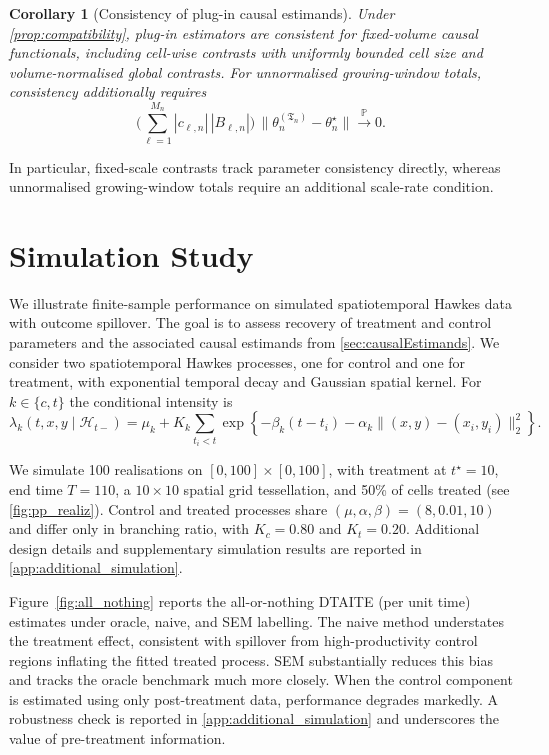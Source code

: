 \documentclass{statsoc}
\newtheorem{corollary}[corollary]{Corollary}
\newcommand{\1}{\mathbbm{1}}
\newcommand{\Tmax}{\mathfrak{T}}
\begin{document}
\begin{corollary}[Consistency of plug-in causal estimands]\label{cor:estimands-compat}
Under \cref{prop:compatibility}, plug-in estimators are consistent for fixed-volume causal functionals, including cell-wise contrasts with uniformly bounded cell size and volume-normalised global contrasts. For unnormalised growing-window totals, consistency additionally requires
\[
\Big(\sum_{\ell=1}^{M_n}|c_{\ell,n}|\,|B_{\ell,n}|\Big)\,
\|\theta_n^{(\Tmax_n)}-\theta_n^\star\|
\xrightarrow{\mathbb P}0.
\]
\end{corollary}

In particular, fixed-scale contrasts track parameter consistency directly, whereas unnormalised growing-window totals require an additional scale-rate condition.

\section{Simulation Study}\label{sec:simulation_study}

We illustrate finite-sample performance on simulated spatiotemporal Hawkes data with outcome spillover. The goal is to assess recovery of treatment and control parameters and the associated causal estimands from \cref{sec:causalEstimands}. We consider two spatiotemporal Hawkes processes, one for control and one for treatment, with exponential temporal decay and Gaussian spatial kernel. For $k\in\{c,t\}$ the conditional intensity is
\begin{equation*}
\lambda_k(t,x,y \mid \mathcal{H}_{t-}) = \mu_k + K_k \sum_{t_i < t} \exp\!\left\{-\beta_k (t-t_i)
- \alpha_k  \big\|(x,y) - (x_i,y_i)\big\|_{2}^{2} \right\}. 
\end{equation*}

We simulate 100 realisations on \([0,100]\times[0,100]\), with treatment at \(t^\star=10\), end time \(T=110\), a \(10\times10\) spatial grid tessellation, and 50\% of cells treated (see \cref{fig:pp_realiz}). Control and treated processes share \((\mu,\alpha,\beta)=(8,0.01,10)\) and differ only in branching ratio, with \(K_c=0.80\) and \(K_t=0.20\). Additional design details and supplementary simulation results are reported in \cref{app:additional_simulation}.

Figure~\ref{fig:all_nothing} reports the all-or-nothing DTAITE (per unit time) estimates under oracle, naive, and SEM labelling. The naive method understates the treatment effect, consistent with spillover from high-productivity control regions inflating the fitted treated process. SEM substantially reduces this bias and tracks the oracle benchmark much more closely. When the control component is estimated using only post-treatment data, performance degrades markedly. A robustness check is reported in \cref{app:additional_simulation} and underscores the value of pre-treatment information.
\end{document}

